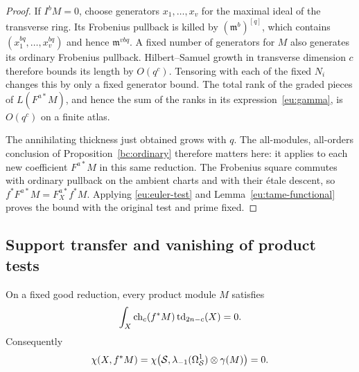 \begin{proof}
If $I^bM=0$, choose generators $x_1,\ldots,x_v$ for the maximal ideal
of the transverse ring.  Its Frobenius pullback is killed by
$(\mathfrak m^b)^{[q]}$, which contains
$(x_1^{bq},\ldots,x_v^{bq})$ and hence $\mathfrak m^{vbq}$.
A fixed number of generators for $M$ also generates its ordinary
Frobenius pullback.  Hilbert--Samuel growth in transverse dimension $c$
therefore bounds its length by $O(q^c)$.  Tensoring with each of the
fixed $N_i$ changes this by only a fixed generator bound.  The total
rank of the graded pieces of $L(F^{a*}M)$, and hence the sum of the
ranks in its expression~\eqref{eu:gamma}, is $O(q^c)$ on a finite atlas.

The annihilating thickness just obtained grows with $q$.  The
all-modules, all-orders conclusion of Proposition~\ref{bc:ordinary}
therefore matters here: it applies to each new coefficient
$F^{a*}M$ in this same reduction.  The Frobenius square commutes with
ordinary pullback on the ambient charts and with their \'etale
descent, so $f^*F^{a*}M=F_X^{a*}f^*M$.  Applying
\eqref{eu:euler-test} and Lemma~\ref{eu:tame-functional} proves the
bound with the original test and prime fixed.
\end{proof}

\subsection{Support transfer and vanishing of product tests}

\begin{lemma}\label{eu:test-number}
On a fixed good reduction, every product module $M$ satisfies
\begin{equation}\label{eu:test-leading-zero}
           \int_X\operatorname{ch}_c(f^*M)\operatorname{td}_{2n-c}(X)=0.
\end{equation}
Consequently
\begin{equation}\label{eu:all-tests-zero}
 \chi(X,f^*M)=
 \chi\bigl(\mathcal S,\lambda_{-1}(\Omega^1_{\mathcal S})\otimes\gamma(M)\bigr)=0.
\end{equation}
\end{lemma}

